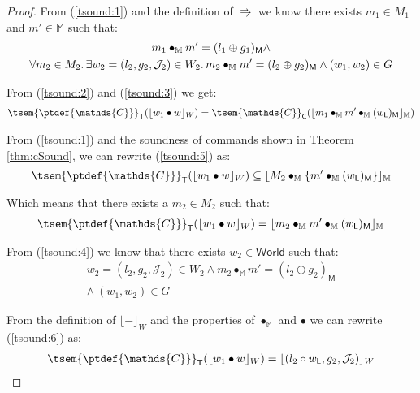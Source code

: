 \begin{thm}
{\begin{proof}
	From (\ref{tsound:1}) and the definition of $\Rrightarrow$ we know there exists $m_1 \in M_1$ and $m' \in \mathbb{M}$ such that:
	\begin{gather}
	\label{tsound:3} m_1 \bullet_\mathbb{M} m' = (l_1 \oplus g_1)_\mathsf{M} \land \\
	\label{tsound:4} \forall m_2 \in M_2 \ldotp \exists w_2 = (l_2, g_2, \mathcal{J}_2) \in W_2 \ldotp m_2 \bullet_\mathbb{M} m' = (l_2 \oplus g_2)_\mathsf{M} \land (w_1, w_2) \in G
	\end{gather}
	
	From (\ref{tsound:2}) and (\ref{tsound:3}) we get:
	\begin{gather}\label{tsound:5}
	\tsem{\ptdef{\mathds{C}}}_\mathsf{T}(\lfloor w_1 \bullet w \rfloor_W) =
	\tsem{\mathds{C}}_\mathsf{C}(\lfloor m_1 \bullet_\mathbb{M} m' \bullet_\mathbb{M} (w_\mathsf{L})_\mathsf{M} \rfloor_\mathbb{M})
	\end{gather}
	
	From (\ref{tsound:1}) and the soundness of commands shown in Theorem \ref{thm:cSound}, we can rewrite (\ref{tsound:5}) as:
	\[
		\tsem{\ptdef{\mathds{C}}}_\mathsf{T}(\lfloor w_1 \bullet w \rfloor_W)
		\subseteq
		\lfloor M_2 \bullet_\mathbb{M} \{m' \bullet_\mathbb{M} (w_\mathsf{L})_\mathsf{M}\} \rfloor_\mathbb{M}
	\]
	
	Which means that there exists a $m_2 \in M_2$ such that:
	\begin{gather}\label{tsound:6}
		\tsem{\ptdef{\mathds{C}}}_\mathsf{T}(\lfloor w_1 \bullet w \rfloor_W)
		=
		\lfloor m_2 \bullet_\mathbb{M} m' \bullet_\mathbb{M} (w_\mathsf{L})_\mathsf{M} \rfloor_\mathbb{M}
	\end{gather}
	
	From (\ref{tsound:4}) we know that there exists $w_2 \in \mathsf{World}$ such that:
	\begin{gather}
	\label{tsound:8} w_2 = (l_2, g_2, \mathcal{J}_2) \in W_2 \land m_2 \bullet_\mathbb{M} m' = (l_2 \oplus g_2)_\mathsf{M} \\
	\label{tsound:7} \land\ (w_1, w_2) \in G
	\end{gather}
	
	From the definition of $\lfloor - \rfloor_W$ and the properties of $\bullet_\mathbb{M}$ and $\bullet$ we can rewrite (\ref{tsound:6}) as:
	\begin{gather}\label{tsound:9}
		\tsem{\ptdef{\mathds{C}}}_\mathsf{T}(\lfloor w_1 \bullet w \rfloor_W)
		=
		\lfloor (l_2 \circ w_\mathsf{L}, g_2, \mathcal{J}_2) \rfloor_W
	\end{gather}
	

\end{proof}}
\end{thm}
